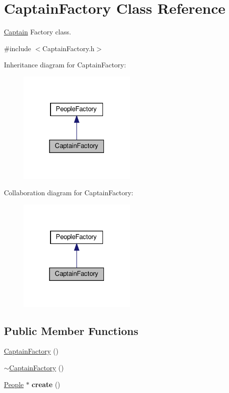 \hypertarget{classCaptainFactory}{}\section{Captain\+Factory Class Reference}
\label{classCaptainFactory}


\hyperlink{classCaptain}{Captain} Factory class.  




{\ttfamily \#include $<$Captain\+Factory.\+h$>$}



Inheritance diagram for Captain\+Factory\+:\nopagebreak
\begin{figure}[H]
\begin{center}
\leavevmode
\includegraphics[width=163pt]{classCaptainFactory__inherit__graph}
\end{center}
\end{figure}


Collaboration diagram for Captain\+Factory\+:\nopagebreak
\begin{figure}[H]
\begin{center}
\leavevmode
\includegraphics[width=163pt]{classCaptainFactory__coll__graph}
\end{center}
\end{figure}
\subsection*{Public Member Functions}
\begin{DoxyCompactItemize}
\item 
\hyperlink{classCaptainFactory_a194bc3adbc4f09ca79df90d1aab30dc1}{Captain\+Factory} ()
\item 
\hyperlink{classCaptainFactory_a1ffe5cdefdefcb36f4c362990dd61080}{$\sim$\+Captain\+Factory} ()
\item 
\mbox{\label{classCaptainFactory_acaf6f25d6b452c13215a143befbd1c71}} 
\hyperlink{classPeople}{People} $\ast$ {\bfseries create} ()
\end{DoxyCompactItemize}



